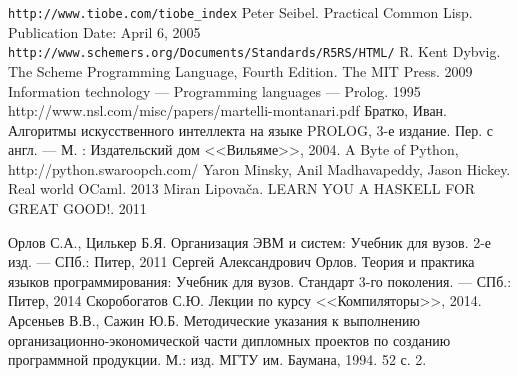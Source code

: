 \begin{thebibliography}{0}
    \verb$http://www.tiobe.com/tiobe_index$
    Peter Seibel. Practical Common Lisp. Publication Date: April 6, 2005
    \verb$http://www.schemers.org/Documents/Standards/R5RS/HTML/$
    R. Kent Dybvig. The Scheme Programming Language, Fourth Edition. The MIT Press. 2009
    Information technology — Programming languages — Prolog. 1995
    http://www.nsl.com/misc/papers/martelli-montanari.pdf
    Братко, Иван. Алгоритмы искусственного интеллекта на языке PROLOG, 3-е издание. Пер. с англ. --- М. : Издательский дом <<Вильяме>>, 2004.
    A Byte of Python, http://python.swaroopch.com/
    Yaron Minsky, Anil Madhavapeddy, Jason Hickey. Real world OCaml. 2013
    Miran Lipovača. LEARN YOU A HASKELL FOR GREAT GOOD!. 2011 

     Орлов С.А., Цилькер Б.Я. Организация ЭВМ и систем: Учебник для вузов. 2-е изд. --- СПб.: Питер, 2011
     Сергей Александрович Орлов. Теория и практика языков программирования: Учебник для вузов. Стандарт 3-го поколения. --- СПб.: Питер, 2014
     Скоробогатов С.Ю. Лекции по курсу <<Компиляторы>>, 2014.
     Арсеньев В.В., Сажин Ю.Б. Методические указания к выполнению организационно-экономической части дипломных проектов по созданию программной продукции. М.: изд. МГТУ им. Баумана, 1994. 52 с. 2.
\end{thebibliography}
